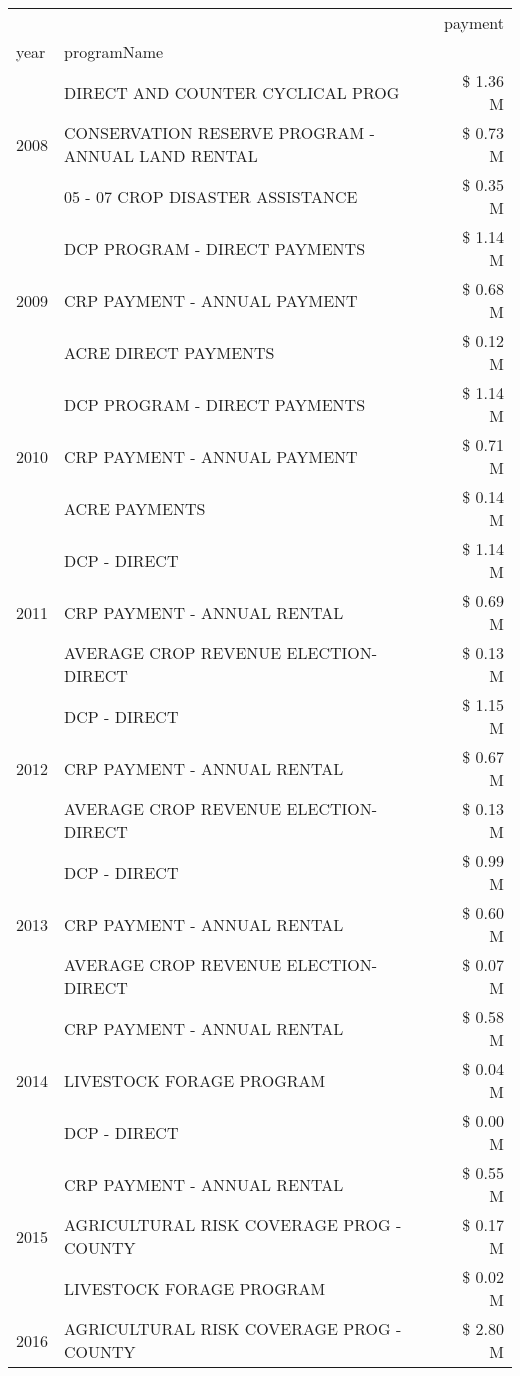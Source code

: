 \begin{tabular}{llr}
\toprule
 &  & payment \\
year & programName &  \\
\midrule
\multirow[t]{3}{*}{2008} & DIRECT AND COUNTER CYCLICAL PROG & \$ 1.36 M \\
 & CONSERVATION RESERVE PROGRAM - ANNUAL LAND RENTAL & \$ 0.73 M \\
 & 05 - 07 CROP DISASTER ASSISTANCE & \$ 0.35 M \\
\cline{1-3}
\multirow[t]{3}{*}{2009} & DCP PROGRAM - DIRECT PAYMENTS & \$ 1.14 M \\
 & CRP PAYMENT - ANNUAL PAYMENT & \$ 0.68 M \\
 & ACRE DIRECT PAYMENTS & \$ 0.12 M \\
\cline{1-3}
\multirow[t]{3}{*}{2010} & DCP PROGRAM - DIRECT PAYMENTS & \$ 1.14 M \\
 & CRP PAYMENT - ANNUAL PAYMENT & \$ 0.71 M \\
 & ACRE PAYMENTS & \$ 0.14 M \\
\cline{1-3}
\multirow[t]{3}{*}{2011} & DCP - DIRECT & \$ 1.14 M \\
 & CRP PAYMENT - ANNUAL RENTAL & \$ 0.69 M \\
 & AVERAGE CROP REVENUE ELECTION-DIRECT & \$ 0.13 M \\
\cline{1-3}
\multirow[t]{3}{*}{2012} & DCP - DIRECT & \$ 1.15 M \\
 & CRP PAYMENT - ANNUAL RENTAL & \$ 0.67 M \\
 & AVERAGE CROP REVENUE ELECTION-DIRECT & \$ 0.13 M \\
\cline{1-3}
\multirow[t]{3}{*}{2013} & DCP - DIRECT & \$ 0.99 M \\
 & CRP PAYMENT - ANNUAL RENTAL & \$ 0.60 M \\
 & AVERAGE CROP REVENUE ELECTION-DIRECT & \$ 0.07 M \\
\cline{1-3}
\multirow[t]{3}{*}{2014} & CRP PAYMENT - ANNUAL RENTAL & \$ 0.58 M \\
 & LIVESTOCK FORAGE PROGRAM & \$ 0.04 M \\
 & DCP - DIRECT & \$ 0.00 M \\
\cline{1-3}
\multirow[t]{3}{*}{2015} & CRP PAYMENT - ANNUAL RENTAL & \$ 0.55 M \\
 & AGRICULTURAL RISK COVERAGE PROG - COUNTY & \$ 0.17 M \\
 & LIVESTOCK FORAGE PROGRAM & \$ 0.02 M \\
\cline{1-3}
\multirow[t]{3}{*}{2016} & AGRICULTURAL RISK COVERAGE PROG - COUNTY      & \$ 2.80 M \\

\end{tabular}
